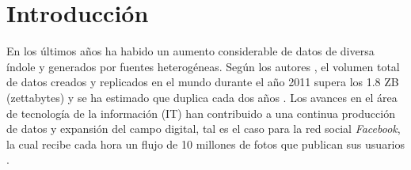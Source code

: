 \chapter{Introducción}

En los últimos años ha habido un aumento considerable de datos de diversa índole y generados por fuentes heterogéneas. Según los autores \citeauthor{gantz_extracting_2011}, el volumen total de datos creados y replicados en el mundo durante el año 2011 supera los 1.8 ZB (zettabytes) y se ha estimado que duplica cada dos años \cite{gantz_extracting_2011}. Los avances en el área de tecnología de la información (IT) han contribuido a una continua producción de datos y expansión del campo digital, tal es el caso para la red social \textit{Facebook}, la cual recibe cada hora un flujo de 10 millones de fotos que publican sus usuarios \cite{mayer-schonberger_big_2013}. 
